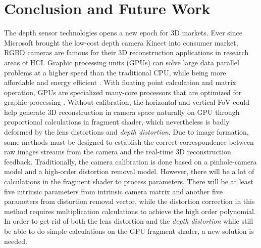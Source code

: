 \chapter{Conclusion and Future Work} %
\label{chapterConclusionAndFutureWork} 
\indent
The depth sensor technologies opens a new epoch for \gls{3D} markets. Ever since Microsoft brought the low-cost depth camera Kinect into consumer market, \gls{RGBD} cameras are famous for their \gls{3D} reconstruction applications in research areas of \gls{HCI}. Graphic processing units (GPUs) can solve large data parallel problems at a higher speed than the traditional CPU, while being more affordable and energy efficient \cite{GPUadvantage_2015}. With floating point calculation and matrix operation, GPUs are specialized many-core processors that are optimized for graphic processing \cite{GPUadvantage02_2013}. Without calibration, the horizontal and vertical \gls{FoV} could help generate \gls{3D} reconstruction in camera space naturally on \gls{GPU} through proportional calculations in fragment shader, which nevertheless is badly deformed by the lens distortions and \emph{depth distortion}. Due to image formation, some methods must be designed to establish the correct correspondence between raw images streams from the camera and the real-time \gls{3D} reconstruction feedback. Traditionally, the camera calibration is done based on a pinhole-camera model and a high-order distortion removal model. However, there will be a lot of calculations in the fragment shader to process parameters. There will be at least five intrinsic parameters from intrinsic camera matrix and another five parameters from distortion removal vector, while the distortion correction in this method requires multiplication calculations to achieve the high order polynomial. In order to get rid of both the lens distortion and the \emph{depth distortion} while still be able to do simple calculations on the \gls{GPU} fragment shader, a new solution is needed.

